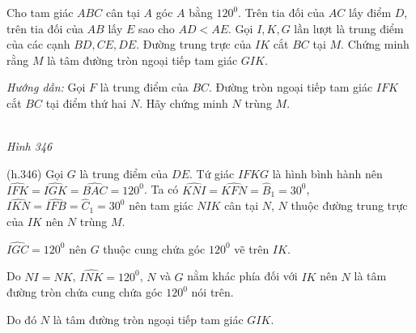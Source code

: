 \begin{bt}%
 Cho tam giác $ABC$ cân tại $A$ góc $A$ bằng $120^0$. Trên tia đối của $AC$ lấy điểm $D$, trên tia đối của $AB$ lấy $E$ sao cho $AD < AE$. Gọi $I, K, G$ lần lượt là trung điểm của các cạnh $BD, CE, DE$. Đường trung trực của $IK$ cắt $BC$ tại $M$. Chứng minh rằng $M$ là tâm đường tròn ngoại tiếp tam giác $GIK$. \smallskip

 \noindent \textit{Hướng dẫn:} Gọi $F$ là trung điểm của $BC$. Đường tròn ngoại tiếp tam giác $IFK$ cắt $BC$ tại điểm thứ hai $N$. Hãy chứng minh $N$ trùng $M$.
 \loigiai
  {
  \begin{center}
   \\
   \textit{Hình 346}
  \end{center}
 \noindent	(h.346) Gọi $G$ là trung điểm của $DE$. Tứ giác $IFKG$ là hình bình hành nên $\widehat{IFK} = \widehat{IGK} = \widehat{BAC} = 120^0$. \smallskip
		\noindent Ta có $\widehat{KNI} = \widehat{KFN} = \widehat{B}_1 = 30^0$, $\widehat{IKN} = \widehat{IFB} = \widehat{C}_1 = 30^0$ nên tam giác $NIK$ cân tại $N$, $N$ thuộc đường trung trực của $IK$ nên $N$ trùng $M$. \smallskip
		
		\noindent $\widehat{IGC} = 120^0$ nên $G$ thuộc cung chứa góc $120^0$
		vẽ trên $IK$. \smallskip
		
		\noindent Do $NI = NK$, $\widehat{INK} = 120^0$, $N$ và $G$ nằm khác phía đối với $IK$ nên $N$ là tâm đường tròn chứa cung chứa góc $120^0$ nói trên. \smallskip
		
		\noindent Do đó $N$	là tâm đường tròn ngoại tiếp tam giác $GIK$.	}
\end{bt}

